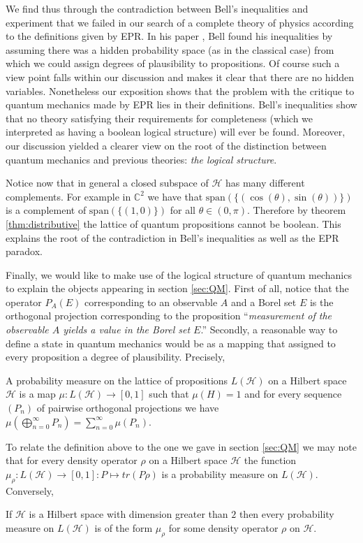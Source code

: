 We find thus through the contradiction between Bell's inequalities and experiment that we failed in our search of a complete theory of physics according to the definitions given by EPR. In his paper \cite{Bell1964}, Bell found his inequalities by assuming there was a hidden probability space (as in the classical case) from which we could assign degrees of plausibility to propositions. Of course such a view point falls within our discussion and makes it clear that there are no hidden variables. Nonetheless our exposition shows that the problem with the critique to quantum mechanics made by EPR lies in their definitions. Bell's inequalities show that no theory satisfying their requirements for completeness (which we interpreted as having a boolean logical structure) will ever be found. Moreover, our discussion yielded a clearer view on the root of the distinction between quantum mechanics and previous theories: \textit{the logical structure}.

Notice now that in general a closed subspace of $\mathcal{H}$ has many different complements. For example in $\mathbb{C}^2$ we have that $\text{span}(\{(\cos(\theta),\sin(\theta))\})$ is a complement of $\text{span}(\{(1,0)\})$ for all $\theta\in (0,\pi)$. Therefore by theorem \ref{thm:distributive} the lattice of quantum propositions cannot be boolean. This explains the root of the contradiction in Bell's inequalities as well as the EPR paradox.

Finally, we would like to make use of the logical structure of quantum mechanics to explain the objects appearing in section \ref{sec:QM}. First of all, notice that the operator $P_A(E)$ corresponding to an observable $A$ and a Borel set $E$ is the orthogonal projection corresponding to the proposition ``\textit{measurement of the observable $A$ yields a value in the Borel set $E$}.'' Secondly, a reasonable way to define a state in quantum mechanics would be as a mapping that assigned to every proposition a degree of plausibility. Precisely,

\begin{definition}
A probability measure on the lattice of propositions $L(\mathcal{H})$ on a Hilbert space $\mathcal{H}$ is a map $\mu:L(\mathcal{H})\to [0,1]$ such that $\mu(H)=1$ and for every sequence $(P_n)$ of pairwise orthogonal projections we have $\mu(\bigoplus_{n=0}^{\infty}P_n)=\sum_{n=0}^{\infty}\mu(P_n)$. 
\end{definition} 

To relate the definition above to the one we gave in section \ref{sec:QM} we may note that for every density operator $\rho$ on a Hilbert space $\mathcal{H}$ the function $\mu_\rho:L(\mathcal{H})\to [0,1]:P\mapsto tr(P\rho)$ is a probability measure on $L(\mathcal{H})$. Conversely,

\begin{theorem}
If $\mathcal{H}$ is a Hilbert space with dimension greater than $2$ then every probability measure on $L(\mathcal{H})$ is of the form $\mu_\rho$ for some density operator $\rho$ on $\mathcal{H}$.
\end{theorem}